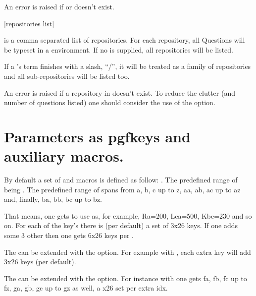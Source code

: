 \documentclass[10pt]{article}
\begin{document}
\begin{tsremark}
An error is raised if  or  doesn't exist.
\end{tsremark}

\begin{codedescribe}{\QuestionsList}\label{quest list}
\begin{codesyntax}%
\tsmacro{\QuestionsList}[repositories list]{}
\end{codesyntax}
 is a comma separated list of repositories. For each repository,  all Questions will be typeset in a  environment. If no  is supplied, all repositories will be listed.
\end{codedescribe}

\begin{tsremark}
If a 's term finishes with a slash, ``/'', it will be treated as a family of repositories and all sub-repositories will be listed too.
\end{tsremark}

\begin{tsremark}
An error is raised if a repository in  doesn't exist. To reduce the clutter (and number of questions listed) one should consider the use of the   option.
\end{tsremark}

\section{Parameters as pgfkeys and auxiliary macros.}\label{parameters}

By default a set of  and macros is defined as follow: . The predefined range of  being . The predefined range of  spans from a, b, c up to z, aa, ab, ac up to az and, finally, ba, bb, bc up to bz. 
\begin{tsremark}
That means, one gets to use  as, for example, Ra=200, Lca=500, Kbe=230 and so on. For each of the key's  there is (per default) a set of 3x26 keys. If one adds some 3 other  then one gets 6x26 keys per .
\end{tsremark}
\begin{tsremark}
The  can be extended with the  option. For example with , each extra key will add 3x26 keys (per default).
\end{tsremark}
\begin{tsremark}
The  can be extended with the  option. For instance with  one gets fa, fb, fc up to fz, ga, gb, gc up to gz as well, a x26 set per extra idx.
\end{tsremark}
\end{document}
